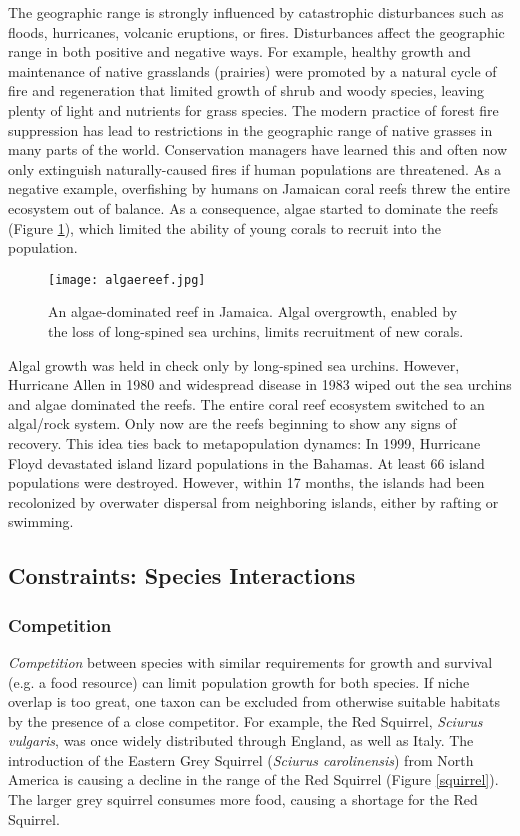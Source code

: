 \documentclass[11pt, hidelinks]{article}
\begin{document}
The geographic range is strongly influenced by catastrophic disturbances such as floods, hurricanes, volcanic eruptions, or fires. Disturbances affect the geographic range in both positive and negative ways. For example, healthy growth and maintenance of native grasslands (prairies) were promoted by a natural cycle of fire and regeneration that limited growth of shrub and woody species, leaving plenty of light and nutrients for grass species. The modern practice of forest fire suppression has lead to restrictions in the geographic range of native grasses in many parts of the world.  Conservation managers have learned this and often now only extinguish naturally-caused fires if human populations are threatened. As a negative example, overfishing by humans on Jamaican coral reefs threw the entire ecosystem out of balance.  As a consequence, algae started to dominate the reefs (Figure \ref{reef}), which limited the ability of young corals to recruit into the population.  

\begin{figure}[hb]
	\centering
	\texttt{[image: algaereef.jpg]}
	\caption{An algae-dominated reef in Jamaica. Algal overgrowth, enabled by the loss of long-spined sea urchins, limits recruitment of new corals.\label{reef}}
\end{figure}

Algal growth was held in check only by long-spined sea urchins.  However, Hurricane Allen in 1980 and widespread disease in 1983 wiped out the sea urchins and algae dominated the reefs.  The entire coral reef ecosystem switched to an algal/rock system.  Only now are the reefs beginning to show any signs of recovery. This idea ties back to metapopulation dynamcs: In 1999, Hurricane Floyd devastated island lizard populations in the Bahamas.  At least 66 island populations were destroyed. However, within 17 months, the islands had been recolonized by overwater dispersal from neighboring islands, either by rafting or swimming.

\subsection{Constraints: Species Interactions}
\subsubsection{Competition}
\emph{Competition} between species with similar requirements for growth and survival (e.g. a food resource) can limit population growth for both species. If niche overlap is too great, one taxon can be excluded from otherwise suitable habitats by the presence of a close competitor.  For example, the Red Squirrel, \emph{Sciurus vulgaris}, was once widely distributed through England, as well as Italy.  The introduction of the Eastern Grey Squirrel (\emph{Sciurus carolinensis}) from North America is causing a decline in the range of the Red Squirrel (Figure \ref{squirrel}).  The larger grey squirrel consumes more food, causing a shortage for the Red Squirrel. 
\end{document}
